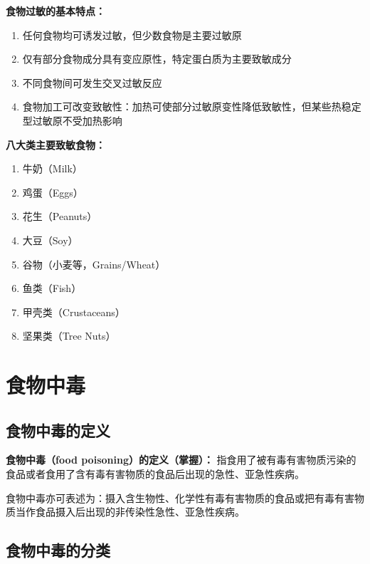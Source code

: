 \textbf{食物过敏的基本特点：}
\begin{enumerate}[leftmargin=*]
    \item 任何食物均可诱发过敏，但少数食物是主要过敏原
    \item 仅有部分食物成分具有变应原性，特定蛋白质为主要致敏成分
    \item 不同食物间可发生交叉过敏反应
    \item 食物加工可改变致敏性：加热可使部分过敏原变性降低致敏性，但某些热稳定型过敏原不受加热影响
\end{enumerate}

\textbf{八大类主要致敏食物：}
\begin{enumerate}[leftmargin=*]
    \item 牛奶（Milk）
    \item 鸡蛋（Eggs）
    \item 花生（Peanuts）
    \item 大豆（Soy）
    \item 谷物（小麦等，Grains/Wheat）
    \item 鱼类（Fish）
    \item 甲壳类（Crustaceans）
    \item 坚果类（Tree Nuts）
\end{enumerate}

\section{食物中毒}

\subsection{食物中毒的定义}

\begin{keybox}
\textbf{食物中毒（food poisoning）的定义（掌握）：}
指食用了被有毒有害物质污染的食品或者食用了含有毒有害物质的食品后出现的急性、亚急性疾病。
\end{keybox}

食物中毒亦可表述为：摄入含生物性、化学性有毒有害物质的食品或把有毒有害物质当作食品摄入后出现的非传染性急性、亚急性疾病。

\subsection{食物中毒的分类}

